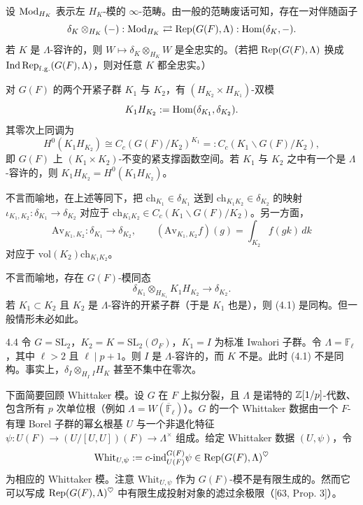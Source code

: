 设 $\operatorname{Mod}_{H_K}$ 表示左 $H_K$-模的 $\infty$-范畴。由一般的范畴废话可知，存在一对伴随函子
\[
\delta_K\otimes_{H_K}(-):\operatorname{Mod}_{H_K}\rightleftarrows\operatorname{Rep}(G(F),\Lambda):\operatorname{Hom}(\delta_K,-).
\]
若 $K$ 是 $\Lambda$-容许的，则 $W\mapsto\delta_K\otimes_{H_K}W$ 是全忠实的。（若把 $\operatorname{Rep}(G(F),\Lambda)$ 换成 $\operatorname{Ind}\operatorname{Rep}_{\mathrm{f.g.}}(G(F),\Lambda)$，则对任意 $K$ 都全忠实。）

对 $G(F)$ 的两个开紧子群 $K_1$ 与 $K_2$，有 $(H_{K_2}\times H_{K_1})$-双模
\[
K_1H_{K_2}:=\operatorname{Hom}(\delta_{K_1},\delta_{K_2}).
\]
其零次上同调为
\[
H^0(K_1H_{K_2})\cong C_c(G(F)/K_2)^{K_1}=:C_c(K_1\backslash G(F)/K_2),
\]
即 $G(F)$ 上 $(K_1\times K_2)$-不变的紧支撑函数空间。若 $K_1$ 与 $K_2$ 之中有一个是 $\Lambda$-容许的，则 $K_1H_{K_2}=H^0(K_1H_{K_2})$。

不言而喻地，在上述等同下，把 $\mathrm{ch}_{K_1}\in\delta_{K_1}$ 送到 $\mathrm{ch}_{K_1K_2}\in\delta_{K_2}$ 的映射 $\iota_{K_1,K_2}:\delta_{K_1}\to\delta_{K_2}$ 对应于 $\mathrm{ch}_{K_1K_2}\in C_c(K_1\backslash G(F)/K_2)$。另一方面，
\[
\mathrm{Av}_{K_1,K_2}:\delta_{K_1}\to\delta_{K_2},\qquad
(\mathrm{Av}_{K_1,K_2}f)(g)=\int_{K_2}f(gk)\,dk
\]
对应于 $\mathrm{vol}(K_2)\mathrm{ch}_{K_1K_2}$。

不言而喻地，存在 $G(F)$-模同态
\begin{equation}
\tag{4.1}
\delta_{K_1}\otimes_{H_{K_1}}K_1H_{K_2}\to\delta_{K_2}.
\end{equation}
若 $K_1\subset K_2$ 且 $K_2$ 是 $\Lambda$-容许的开紧子群（于是 $K_1$ 也是），则 (4.1) 是同构。但一般情形未必如此。

\begin{exam}{4.4}
令 $G=\mathrm{SL}_2$，$K_2=K=\mathrm{SL}_2(\mathcal{O}_F)$，$K_1=I$ 为标准 Iwahori 子群。令 $\Lambda=\mathbb{F}_\ell$，其中 $\ell>2$ 且 $\ell\mid p+1$。则 $I$ 是 $\Lambda$-容许的，而 $K$ 不是。此时 (4.1) 不是同构。事实上，$\delta_I\otimes_{H_I}{}_IH_K$ 甚至不集中在零次。
\end{exam}

下面简要回顾 Whittaker 模。设 $G$ 在 $F$ 上拟分裂，且 $\Lambda$ 是诺特的 $\mathbb{Z}[1/p]$-代数、包含所有 $p$ 次单位根（例如 $\Lambda=W(\overline{\mathbb{F}}_\ell)$）。$G$ 的一个 Whittaker 数据由一个 $F$-有理 Borel 子群的幂幺根基 $U$ 与一个非退化特征 $\psi:U(F)\to(U/[U,U])(F)\to\Lambda^\times$ 组成。给定 Whittaker 数据 $(U,\psi)$，令
\[
\mathrm{Whit}_{U,\psi}:=c\text{-}\mathrm{ind}_{U(F)}^{G(F)}\psi\in\operatorname{Rep}(G(F),\Lambda)^{\heartsuit}
\]
为相应的 Whittaker 模。注意 $\mathrm{Whit}_{U,\psi}$ 作为 $G(F)$-模不是有限生成的。然而它可以写成 $\operatorname{Rep}(G(F),\Lambda)^{\heartsuit}$ 中有限生成投射对象的滤过余极限（[63, Prop. 3]）。

